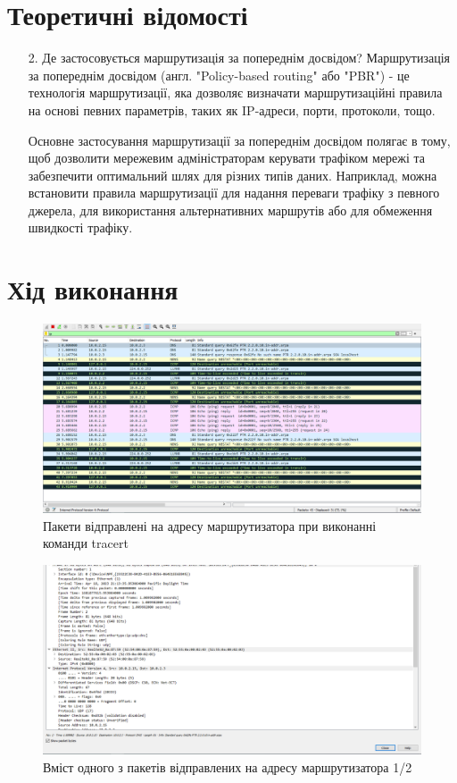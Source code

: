 \documentclass{article}
\begin{document}
\begin{normalsize}
\section*{Теоретичні відомості}
\begin{enumerate}
	\item[2.] Де застосовується маршрутизація за попереднім досвідом?
	Маршрутизація за попереднім досвідом (англ. "Policy-based routing" або "PBR") - це технологія маршрутизації, яка дозволяє визначати маршрутизаційні правила на основі певних параметрів, таких як IP-адреси, порти, протоколи, тощо.
	
	Основне застосування маршрутизації за попереднім досвідом полягає в тому, щоб дозволити мережевим адміністраторам керувати трафіком мережі та забезпечити оптимальний шлях для різних типів даних. Наприклад, можна встановити правила маршрутизації для надання переваги трафіку з певного джерела, для використання альтернативних маршрутів або для обмеження швидкості трафіку. 
\end{enumerate}

\section*{Хід виконання}
 
\begin{figure}[H]
	\centering
	\includegraphics[width=\textwidth]{11}
	\caption{Пакети відправлені на адресу маршрутизатора при виконанні команди tracert}
\end{figure}

\begin{figure}[H]
	\centering
	\includegraphics[width=\textwidth]{12}
	\caption{Вміст одного з пакетів відправлених на адресу маршрутизатора 1/2}
\end{figure}


\end{normalsize}
\end{document}

